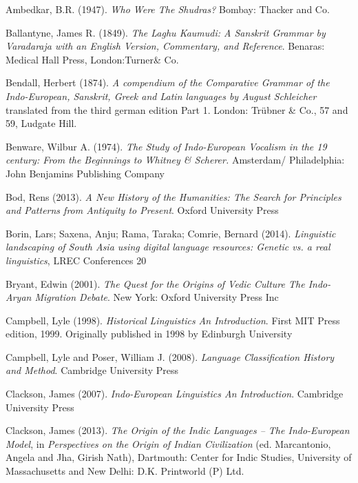 \begin{thebibliography}{99}
 Ambedkar, B.R. (1947). \textit{Who Were The Shudras?} Bombay: Thacker and Co.

  Ballantyne, James R. (1849). \textit{The Laghu Kaumudi: A Sanskrit Grammar by Varadaraja with an English Version, Commentary, and Reference}. Benaras: Medical Hall Press, London:Turner\& Co. 

  Bendall, Herbert (1874). \textit{A compendium of the Comparative Grammar of the Indo-European, Sanskrit, Greek and Latin languages by August Schleicher} translated from the third german edition Part 1. London: Trübner \& Co., 57 and 59, Ludgate Hill. 

  Benware, Wilbur A. (1974). \textit{The Study of Indo-European Vocalism in the 19 century: From the Beginnings to Whitney \& Scherer.} Amsterdam/ Philadelphia: John Benjamins Publishing Company 

  Bod, Rens (2013). \textit{A New History of the Humanities: The Search for Principles and Patterns from Antiquity to Present}. Oxford University Press

  Borin, Lars; Saxena, Anju; Rama, Taraka; Comrie, Bernard (2014). \textit{Linguistic landscaping of South Asia using digital language resources: Genetic vs. a real linguistics}, LREC Conferences 20

  Bryant, Edwin (2001). \textit{The Quest for the Origins of Vedic Culture The Indo-Aryan Migration Debate}. New York: Oxford University Press Inc

  Campbell, Lyle (1998). \textit{Historical Linguistics An Introduction}. First MIT Press edition, 1999. Originally published in 1998 by Edinburgh University

  Campbell, Lyle and Poser, William J. (2008). \textit{Language Classification History and Method}. Cambridge University Press

  Clackson, James (2007). \textit{Indo-European Linguistics An Introduction}. Cambridge University Press

  Clackson, James (2013). \textit{The Origin of the Indic Languages – The Indo-European Model}, in \textit{Perspectives on the Origin of Indian Civilization} (ed. Marcantonio, Angela and Jha, Girish Nath), Dartmouth: Center for Indic Studies, University of Massachusetts and New Delhi: D.K. Printworld (P) Ltd.


\end{thebibliography}
